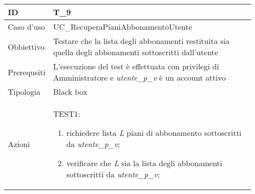 \begin{table}[hb]
    \centering
    \begin{tabular}{ |p{2cm}|p{10cm}|  }
        \hline
        ID          & T\_9                                                                                                         \\\hline
        Caso d'uso  & UC\_RecuperaPianiAbbonamentoUtente                                                                           \\\hline
        Obbiettivo  & Testare che la lista degli abbonamenti restituita sia quella degli abbonamenti
        sottoscritti dall'utente                                                                                                   \\\hline
        Prerequsiti & L'esecuzione del test è effettuata con privilegi di Amministratore e \emph{utente\_p\_v} è un account attivo \\\hline
        Tipologia   & Black box                                                                                                    \\\hline
        Azioni      &
        TEST1:
        \begin{enumerate}[nosep, topsep=0pt]
            \item richiedere lista \emph{L} piani di abbonamento sottoscritti da \emph{utente\_p\_v};
            \item verificare che \emph{L} sia la lista degli abbonamenti sottoscritti da \emph{utente\_p\_v};
        \end{enumerate}
        \\\hline
    \end{tabular}
\end{table}

